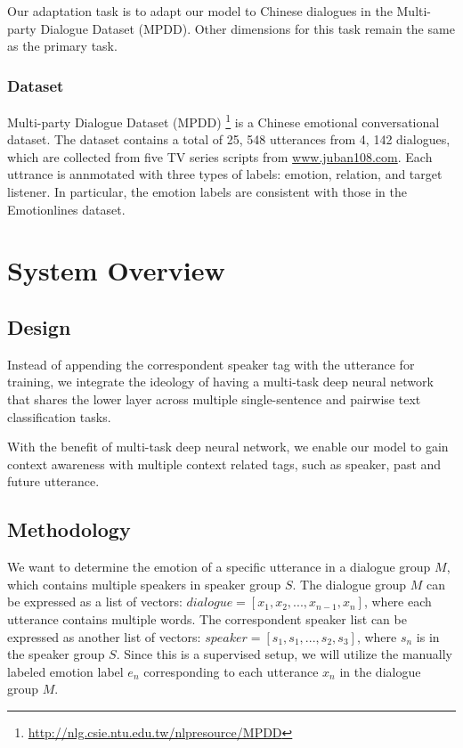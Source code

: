 \documentclass[11pt]{article}
\begin{document}
Our adaptation task is to adapt our model to Chinese dialogues in the Multi-party Dialogue Dataset (MPDD). Other dimensions for this task remain the same as the primary task.

\subsubsection{Dataset}

Multi-party Dialogue Dataset (MPDD) \citep{chen-etal-2020-mpdd} \footnote{\url{http://nlg.csie.ntu.edu.tw/nlpresource/MPDD}} is a Chinese emotional conversational dataset. The dataset contains a total of 25, 548 utterances from 4, 142 dialogues, which are collected from five TV series scripts from \url{www.juban108.com}. Each uttrance is annmotated with three types of labels: emotion, relation, and target listener. In particular, the emotion labels are consistent with those in the Emotionlines dataset.


\section{System Overview}
\label{sec:overview}

\subsection{Design}

Instead of appending the correspondent speaker tag with the utterance for training, we integrate the ideology of having a multi-task deep neural network that shares the lower layer across multiple single-sentence and pairwise text classification tasks. 

With the benefit of multi-task deep neural network, we enable our model to gain context awareness with multiple context related tags, such as speaker, past and future utterance.

\subsection{Methodology}

We want to determine the emotion of a specific utterance in a dialogue group $M$, which contains multiple speakers in speaker group $S$. The dialogue group $M$ can be expressed as a list of vectors: $dialogue = [x_1, x_2, ..., x_{n-1}, x_n]$, where each utterance contains multiple words. The correspondent speaker list can be expressed as another list of vectors: $speaker = [s_1, s_1, ..., s_2, s_3]$, where $s_n$ is in the speaker group $S$. Since this is a supervised setup, we will utilize the manually labeled emotion label $e_n$ corresponding to each utterance $x_n$ in the dialogue group $M$.
\end{document}
